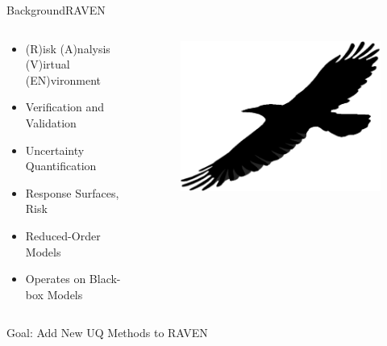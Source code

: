 \documentclass{beamer}
\begin{document}
\begin{frame}{Background}{RAVEN}\vspace{-20pt}
  \begin{columns}
    \begin{column}{0.8\linewidth}
  \begin{itemize}
    \item (R)isk (A)nalysis (V)irtual (EN)vironment
    \item Verification and Validation
    \item Uncertainty Quantification
    \item Response Surfaces, Risk
    \item Reduced-Order Models
    \item Operates on Black-box Models
  \end{itemize}
    \end{column}
    \begin{column}{0.2\linewidth}
    \begin{figure}[h!]
      \centering
        \includegraphics[width=\textwidth]{../../graphics/raven}
      \end{figure} \vspace{-20pt}
    \end{column}
  \end{columns}\vspace{10pt}
  Goal: Add New UQ Methods to RAVEN
\end{frame}
\end{document}
